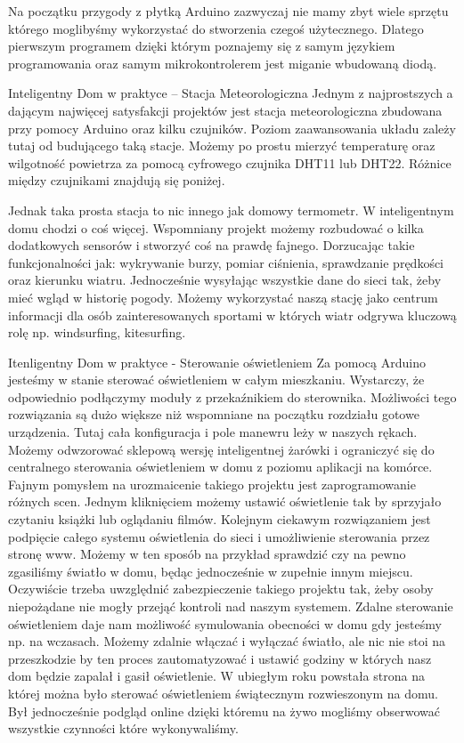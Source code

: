 \documentclass[brudnopis]{xmgr}
\begin{document}
Na początku przygody z płytką Arduino zazwyczaj nie mamy zbyt wiele sprzętu którego moglibyśmy wykorzystać do stworzenia czegoś użytecznego. Dlatego pierwszym programem dzięki którym poznajemy się z samym językiem programowania oraz samym mikrokontrolerem jest miganie wbudowaną diodą.

Inteligentny Dom w praktyce – Stacja Meteorologiczna
Jednym z najprostszych a dającym najwięcej satysfakcji projektów jest stacja meteorologiczna zbudowana przy pomocy Arduino oraz kilku czujników. Poziom zaawansowania układu zależy tutaj od budującego taką stacje. Możemy po prostu mierzyć temperaturę oraz wilgotność powietrza za pomocą cyfrowego czujnika DHT11 lub DHT22. Różnice między czujnikami znajdują się poniżej. 

Jednak taka prosta stacja to nic innego jak domowy termometr. W inteligentnym domu chodzi o coś więcej. Wspomniany projekt możemy rozbudować o kilka dodatkowych sensorów i stworzyć coś na prawdę fajnego. 
Dorzucając takie funkcjonalności jak: wykrywanie burzy, pomiar ciśnienia, sprawdzanie prędkości oraz kierunku wiatru. Jednocześnie wysyłając wszystkie dane do sieci tak, żeby mieć wgląd w historię pogody. Możemy wykorzystać naszą stację jako centrum informacji dla osób zainteresowanych sportami w których wiatr odgrywa kluczową rolę np. windsurfing, kitesurfing. 

Itenligentny Dom w praktyce - Sterowanie oświetleniem
Za pomocą Arduino jesteśmy w stanie sterować oświetleniem w całym mieszkaniu. Wystarczy, że odpowiednio podłączymy moduły z przekaźnikiem do sterownika. Możliwości tego rozwiązania są dużo większe niż wspomniane na początku rozdziału gotowe urządzenia. Tutaj cała konfiguracja i pole manewru leży w naszych rękach. Możemy odwzorować sklepową wersję inteligentnej żarówki i ograniczyć się do centralnego sterowania oświetleniem w domu z poziomu aplikacji na komórce.
Fajnym pomysłem na urozmaicenie takiego projektu jest zaprogramowanie różnych scen. Jednym kliknięciem możemy ustawić oświetlenie tak by sprzyjało czytaniu książki lub oglądaniu filmów.
Kolejnym ciekawym rozwiązaniem jest podpięcie całego systemu oświetlenia do sieci i umożliwienie sterowania przez stronę www. Możemy w ten sposób na przykład sprawdzić czy na pewno zgasiliśmy światło w domu, będąc jednocześnie w zupełnie innym miejscu. Oczywiście trzeba uwzględnić zabezpieczenie takiego projektu tak, żeby osoby niepożądane nie mogły przejąć kontroli nad naszym systemem. Zdalne sterowanie oświetleniem daje nam możliwość symulowania obecności w domu gdy jesteśmy np. na wczasach. Możemy zdalnie włączać i wyłączać światło, ale nic nie stoi na przeszkodzie by ten proces zautomatyzować i ustawić godziny w których nasz dom będzie zapalał i gasił oświetlenie.
W ubiegłym roku powstała strona na której można było sterować oświetleniem świątecznym rozwieszonym na domu. Był jednocześnie podgląd online dzięki któremu na żywo mogliśmy obserwować wszystkie czynności które wykonywaliśmy. 
\end{document}
